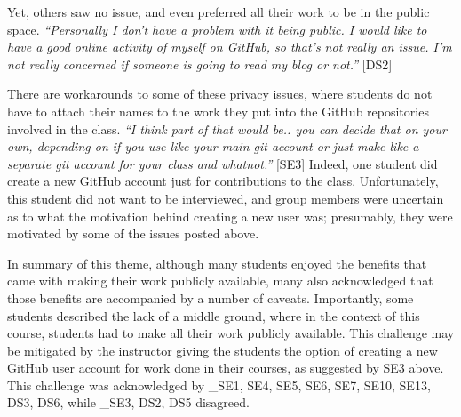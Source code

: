 
Yet, others saw no issue, and even preferred all their work to be in the public space. \textit{``Personally I don't have a problem with it being public. I would like to have a good online activity of myself on GitHub, so that's not really an issue. I'm not really concerned if someone is going to read my blog or not.''} [DS2]

There are workarounds to some of these privacy issues, where students do not have to attach their names to the work they put into the GitHub repositories involved in the class. \textit{``I think part of that would be.. you can decide that on your own, depending on if you use like your main git account or just make like a separate git account for your class and whatnot.''} [SE3] Indeed, one student did create a new GitHub account just for contributions to the class. Unfortunately, this student did not want to be interviewed, and group members were uncertain as to what the motivation behind creating a new user was; presumably, they were motivated by some of the issues posted above.

In summary of this theme, although many students enjoyed the benefits that came with making their work publicly available, many also acknowledged that those benefits are accompanied by a number of caveats. Importantly, some students described the lack of a middle ground, where in the context of this course, students had to make all their work publicly available. This challenge may be mitigated by the instructor giving the students the option of creating a new GitHub user account for work done in their courses, as suggested by SE3 above. This challenge was acknowledged by _{SE1, SE4, SE5, SE6, SE7, SE10, SE13, DS3, DS6}, while _{SE3, DS2, DS5} disagreed.


